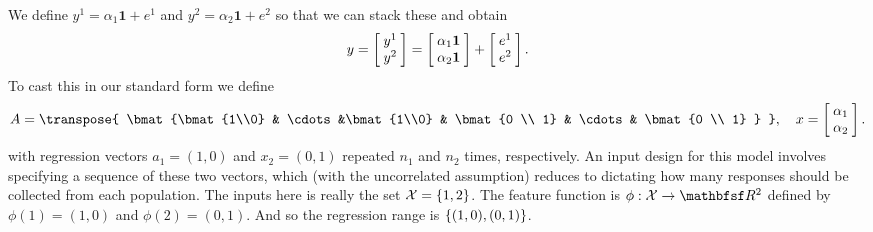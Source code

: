 We define $y^1 = \alpha_1\mathbf{1} + e^1$ and $y^2 = \alpha_2\mathbf{1} + e^2$ so that we can stack these and obtain
\[
	y = \bmat{y^1 \\ y^2} = \bmat{\alpha_1\mathbf{1} \\ \alpha_2\mathbf{1}} + \bmat{e^1 \\ e^2}.
\]
To cast this in our standard form we define
\[
	A = \transpose{
		\bmat{\bmat{1\\0} & \cdots &\bmat{1\\0} & \bmat{0 \\ 1} & \cdots & \bmat{0 \\ 1}
		}
		}, \quad x = \bmat{\alpha_1 \\ \alpha_2}.
\]
with regression vectors $a_1 = (1, 0)$ and $x_2 = (0, 1)$ repeated $n_1$ and $n_2$ times, respectively.
An input design for this model involves specifying a sequence of these two vectors, which (with the uncorrelated assumption) reduces to dictating how many responses should be collected from each population.
The inputs here is really the set $\mathcal{X} = \{1, 2\}$.
The feature function is $\phi: \CX \to \R^2$ defined by $\phi(1) = (1, 0)$ and $\phi(2) = (0, 1)$.
And so the regression range is $\{(1, 0), (0, 1)\}$.
